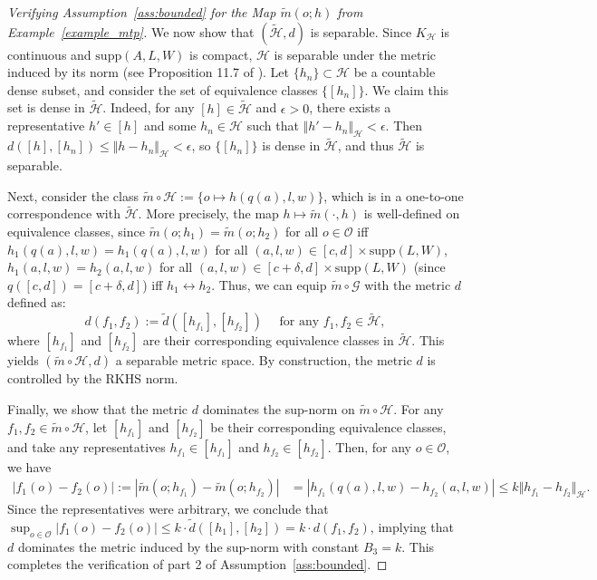 \documentclass[twoside,11pt]{article}
\newcommand{\mc}{\mathcal}
\begin{document}
\begin{proof}[Verifying Assumption~\ref{ass:bounded} for the Map $\widetilde{m}(o;h)$ from Example~\ref{example_mtp}]
 We now show that $(\widetilde{\mc{H}},d)$ is separable. Since $K_\mc{H}$ is continuous and $\text{supp}(A,L,W)$ is compact, $\mc{H}$ is separable under the metric induced by its norm (see Proposition 11.7 of \cite{paulsen2016introduction}). Let $\{h_n\}\subset\mc{H}$ be a countable dense subset, and consider the set of equivalence classes $\{[h_n]\}$. We claim this set is dense in $\widetilde{\mc{H}}$. Indeed, for any $[h]\in\widetilde{\mc{H}}$ and $\epsilon>0$, there exists a representative $h'\in[h]$ and some $h_n\in\mc{H}$ such that $\Vert h'-h_n\Vert_\mc{H}<\epsilon$. Then $d([h],[h_n])\le\Vert h-h_n\Vert_\mc{H}<\epsilon$, so $\{[h_n]\}$ is dense in $\widetilde{\mc{H}}$, and thus $\widetilde{\mc{H}}$ is separable.

    Next, consider the class $\widetilde{m}\circ \mc{H}:=\{o\mapsto h(q(a),l,w)\}$, which is in a one-to-one correspondence with $\widetilde{\mc{H}}$. More precisely, the map $h\mapsto \widetilde{m}(\cdot,h)$ is well-defined on equivalence classes, since $ \widetilde{m}(o;h_1)=\widetilde{m}(o;h_2)$ for all $o\in\mc{O}$ iff $h_1(q(a),l,w)=h_1(q(a),l,w)$ for all $(a,l,w)\in[c,d]\times\text{supp}(L,W)$, $h_1(a,l,w)=h_2(a,l,w)$ for all $(a,l,w)\in[c+\delta,d]\times\text{supp}(L,W)$ (since $q
    \left([c,d]\right)=[c+\delta,d]$) iff  $h_1\leftrightarrow h_2$. Thus, we can equip $\widetilde{m}\circ\mc{G}$ with the metric $d$ defined as:
    \[
    d(f_1,f_2):=\tilde d([h_{f_1}],[h_{f_2}])\quad \text{ for any }f_1,f_2\in\widetilde{\mc{H}},
    \]
    where $[h_{f_1}]$ and $[h_{f_2}]$ are their corresponding equivalence classes in $\widetilde{\mc{H}}$. This
    yields $(\widetilde{m}\circ\mc{H},d)$ a separable metric space. By construction, the metric $d$ is controlled by the RKHS norm.

    Finally, we show that the metric $d$ dominates the sup-norm on $\widetilde{m}\circ\mc{H}$. For any $f_1,f_2\in \widetilde{m}\circ\mc{H}$, let $[h_{f_1}]$ and $[h_{f_2}]$ be their corresponding equivalence classes, and take any representatives $h_{f_1}\in [h_{f_1}]$ and $h_{f_2}\in [h_{f_2}]$. Then, for any $o\in\mc{O}$, we have
    \begin{align*}
        |f_1(o)-f_2(o)|:=|\widetilde{m}(o;h_{f_1})-\widetilde{m}(o;h_{f_2})|&=|h_{f_1}(q(a),l,w)-h_{f_2}(a,l,w)|\le k\Vert h_{f_1}-h_{f_2}\Vert_\mc{H}.
    \end{align*}
    Since the representatives were arbitrary, we conclude that $ \sup_{o\in\mc{O}} |f_1(o)-f_2(o)|\le k\cdot \tilde d([h_1],[h_2])=k\cdot d(f_1,f_2)$, implying that $d$ dominates the metric induced by the sup-norm with constant $B_3=k$. This completes the verification of part 2 of Assumption~\ref{ass:bounded}.
    \end{proof}
\end{document}
